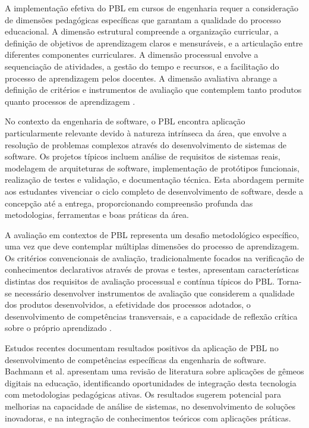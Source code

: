 \documentclass[12pt,a4paper]{article}
\renewcommand{\cite}[1]{}
\begin{document}
A implementação efetiva do PBL em cursos de engenharia requer a consideração de
dimensões pedagógicas específicas que garantam a qualidade do processo
educacional. A dimensão estrutural compreende a organização curricular, a
definição de objetivos de aprendizagem claros e mensuráveis, e a articulação
entre diferentes componentes curriculares. A dimensão processual envolve a
sequenciação de atividades, a gestão do tempo e recursos, e a facilitação do
processo de aprendizagem pelos docentes. A dimensão avaliativa abrange a
definição de critérios e instrumentos de avaliação que contemplem tanto
produtos quanto processos de aprendizagem \cite{thomas2000}.

No contexto da engenharia de software, o PBL encontra aplicação particularmente
relevante devido à natureza intrínseca da área, que envolve a resolução de
problemas complexos através do desenvolvimento de sistemas de software. Os
projetos típicos incluem análise de requisitos de sistemas reais, modelagem de
arquiteturas de software, implementação de protótipos funcionais, realização de
testes e validação, e documentação técnica. Esta abordagem permite aos
estudantes vivenciar o ciclo completo de desenvolvimento de software, desde a
concepção até a entrega, proporcionando compreensão profunda das metodologias,
ferramentas e boas práticas da área.

A avaliação em contextos de PBL representa um desafio metodológico específico,
uma vez que deve contemplar múltiplas dimensões do processo de aprendizagem. Os
critérios convencionais de avaliação, tradicionalmente focados na verificação
de conhecimentos declarativos através de provas e testes, apresentam
características distintas dos requisitos de avaliação processual e contínua
típicos do PBL. Torna-se necessário desenvolver instrumentos de avaliação que
considerem a qualidade dos produtos desenvolvidos, a efetividade dos processos
adotados, o desenvolvimento de competências transversais, e a capacidade de
reflexão crítica sobre o próprio aprendizado \cite{hmelo2004}.

Estudos recentes documentam resultados positivos da aplicação de PBL no
desenvolvimento de competências específicas da engenharia de software. Bachmann
et al. \cite{bachmann2023} apresentam uma revisão de literatura sobre
aplicações de gêmeos digitais na educação, identificando oportunidades de
integração desta tecnologia com metodologias pedagógicas ativas. Os resultados
sugerem potencial para melhorias na capacidade de análise de sistemas, no
desenvolvimento de soluções inovadoras, e na integração de conhecimentos
teóricos com aplicações práticas.
\end{document}
